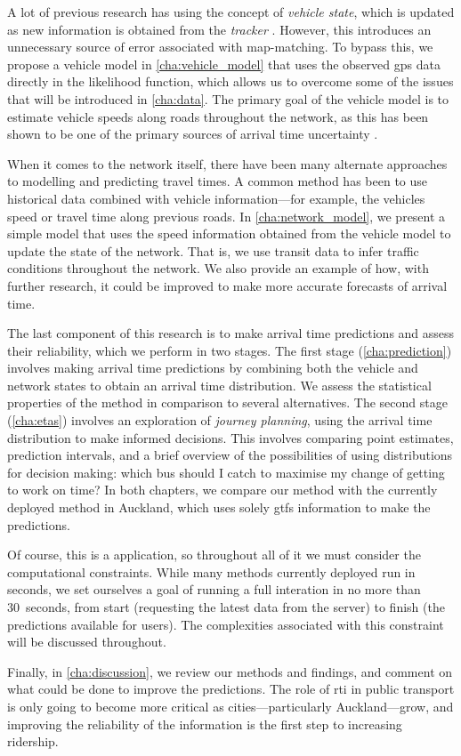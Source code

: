 A lot of previous research has using the concept of \emph{vehicle state}, which is updated as new information is obtained from the \emph{tracker} \citep{Cathey_2003}. However, this introduces an unnecessary source of error associated with map-matching. To bypass this, we propose a \rt{} vehicle model in \cref{cha:vehicle_model} that uses the observed \gls{gps} data directly in the likelihood function, which allows us to overcome some of the issues that will be introduced in \cref{cha:data}. The primary goal of the vehicle model is to estimate vehicle speeds along roads throughout the network, as this has been shown to be one of the primary sources of arrival time uncertainty \citep{Shalaby_2004,Yu_2010,Yu_2011,Yin_2017}.


When it comes to the network itself, there have been many alternate approaches to modelling and predicting travel times. A common method has been to use historical data combined with \rt{} vehicle information---for example, the vehicles speed or travel time along previous roads. In \cref{cha:network_model}, we present a simple \rt{} model that uses the \rt{} speed information obtained from the vehicle model to update the state of the network. That is, we use \rt{} transit data to infer \rt{} traffic conditions throughout the network. We also provide an example of how, with further research, it could be improved to make more accurate forecasts of arrival time.


The last component of this research is to make arrival time predictions and assess their reliability, which we perform in two stages. The first stage (\cref{cha:prediction}) involves making arrival time predictions by combining both the vehicle and network states to obtain an arrival time distribution. We assess the statistical properties of the method in comparison to several alternatives. The second stage (\cref{cha:etas}) involves an exploration of \emph{journey planning}, using the arrival time distribution to make informed decisions. This involves comparing point estimates, prediction intervals, and a brief overview of the possibilities of using distributions for decision making: which bus should I catch to maximise my change of getting to work on time? In both chapters, we compare our method with the currently deployed method in Auckland, which uses solely \gls{gtfs} information to make the predictions.


Of course, this is a \rt{} application, so throughout all of it we must consider the computational constraints. While many methods currently deployed run in seconds, we set ourselves a goal of running a full interation in no more than 30~seconds, from start (requesting the latest data from the server) to finish (the predictions available for users). The complexities associated with this constraint will be discussed throughout.


Finally, in \cref{cha:discussion}, we review our methods and findings, and comment on what could be done to improve the predictions. The role of \gls{rti} in public transport is only going to become more critical as cities---particularly Auckland---grow, and improving the reliability of the information is the first step to increasing ridership.
